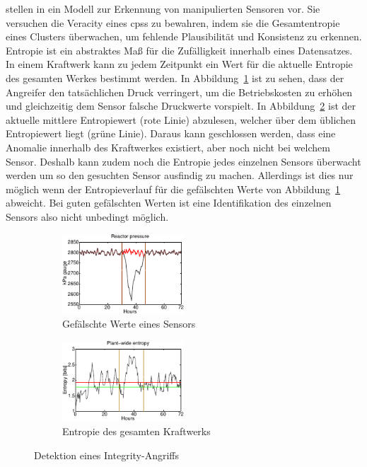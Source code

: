 \documentclass[final,bibliography=totocnumbered]{include/sikseminar}
\newcommand{\cps}{\glspl{cps}\xspace}
\begin{document}
    \citeauthor{KLG15} stellen in \cite{KLG15} ein Modell zur Erkennung von manipulierten Sensoren vor.
    Sie versuchen die Veracity eines \cps zu bewahren, indem sie die Gesamtentropie eines Clusters überwachen, um fehlende Plausibilität und Konsistenz zu erkennen.
    Entropie ist ein abstraktes Maß für die Zufälligkeit innerhalb eines Datensatzes.
    In einem Kraftwerk kann zu jedem Zeitpunkt ein Wert für die aktuelle Entropie des gesamten Werkes bestimmt werden.
    In Abbildung~\ref{fig:spoof} ist zu sehen, dass der Angreifer den tatsächlichen Druck verringert, um die Betriebskosten zu erhöhen und gleichzeitig dem Sensor falsche Druckwerte vorspielt.
    In Abbildung~\ref{fig:entropy_success} ist der aktuelle mittlere Entropiewert (rote Linie) abzulesen, welcher über dem üblichen Entropiewert liegt (grüne Linie).
    Daraus kann geschlossen werden, dass eine Anomalie innerhalb des Kraftwerkes existiert, aber noch nicht bei welchem Sensor.
    Deshalb kann zudem noch die Entropie jedes einzelnen Sensors überwacht werden um so den gesuchten Sensor ausfindig zu machen.
    Allerdings ist dies nur möglich wenn der Entropieverlauf für die gefälschten Werte von Abbildung~\ref{fig:spoof} abweicht.
    Bei guten gefälschten Werten ist eine Identifikation des einzelnen Sensors also nicht unbedingt möglich.

    \begin{figure}
        \centering
        \begin{subfigure}[t]{0.4\textwidth}
            \includegraphics[height=3cm]{entropy_a}
            \caption{Gefälschte Werte eines Sensors}
            \label{fig:spoof}
        \end{subfigure}
        \begin{subfigure}[t]{0.4\textwidth}
            \includegraphics[height=3cm]{entropy_b}
            \caption{Entropie des gesamten Kraftwerks}
            \label{fig:entropy_success}
        \end{subfigure}
        \caption{Detektion eines Integrity-Angriffs~\cite{KLG15}}
        \label{fig:entropie}
    \end{figure}
\end{document}
